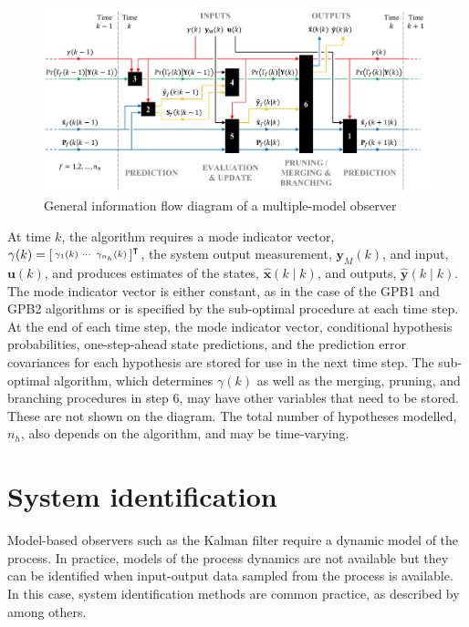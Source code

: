 {{\begin{figure}[ht]
	\centering
	\includegraphics[width=15.5cm]{images/mkf_infoflow.pdf}
	\caption{General information flow diagram of a multiple-model observer}
	\label{fig:mkf-infoflow}
\end{figure}

At time $k$, the algorithm requires a mode indicator vector, $\gamma(k)=\begin{bsmallmatrix} \gamma_1(k) & \cdots & \gamma_{n_h}(k) \end{bsmallmatrix}^\intercal$, the system output measurement, $\mathbf{y}_M(k)$, and input, $\mathbf{u}(k)$, and produces estimates of the states, $\hat{\mathbf{x}}(k \mid k)$, and outputs, $\hat{\mathbf{y}}(k \mid k)$. The mode indicator vector is either constant, as in the case of the \gls{GPB1} and \gls{GPB2} algorithms or is specified by the sub-optimal procedure at each time step. At the end of each time step, the mode indicator vector, conditional hypothesis probabilities, one-step-ahead state predictions, and the prediction error covariances for each hypothesis are stored for use in the next time step. The sub-optimal algorithm, which determines $\gamma(k)$ as well as the merging, pruning, and branching procedures in step 6, may have other variables that need to be stored. These are not shown on the diagram. The total number of hypotheses modelled, $n_h$, also depends on the algorithm, and may be time-varying.

\section{System identification} \label{sec:sys-id}

Model-based observers such as the Kalman filter require a dynamic model of the process. In practice, models of the process dynamics are not available but they can be identified when input-output data sampled from the process is available. In this case, system identification methods are common practice, as described by \cite{ljung_system_1999} among others.

}}
